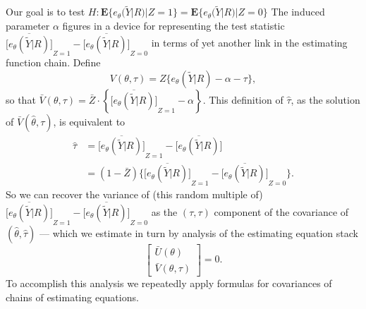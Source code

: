 \documentclass[12pt]{article}
\newcommand{\EE}{\mathbf{E}}
\begin{document}
Our goal is to test $H: \EE \{ e_{\theta} (\tilde{Y} | R) | Z=1 \} =
\EE \{ e_{\theta} (\tilde{Y} | R) | Z=0 \} $ The induced parameter $\alpha$ figures in a device for
representing the test statistic $\overline{\big[ e_{\theta}(\tilde{Y} | R)]}_{Z=1} - \overline{\big[
  e_{\theta}(\tilde{Y} | R )]}_{Z=0}$ in terms of yet another link in the estimating
function chain.  Define  
\begin{equation*} 
    V(\theta, \tau) = Z \{e_{\theta}(\tilde{Y} | R) - \alpha -
    \tau\}, 
\end{equation*}
so that $\bar{V}(\theta, \tau) = \bar{Z} \cdot \left\{
  \overline{\big[e_{\theta}(\tilde{Y} | R) \big]}_{Z=1} - \alpha
\right\}$. This definition of $\hat\tau$, as the solution of
$\bar{V}(\hat\theta, \tau)$, is equivalent to 
\begin{align*}
\hat\tau &=
\overline{\big[e_{\theta}(\tilde{Y} | R) \big]}_{Z=1} -
            \overline{\big[e_{\theta}(\tilde{Y} | R) \big]}  \\
&= (1-\bar{Z})  \big\{ \overline{\big[ e_{\theta}(\tilde{Y} | R)]}_{Z=1} - \overline{\big[
  e_{\theta}(\tilde{Y} | R )]}_{Z=0}  \big\}.
\end{align*}
So we can recover the variance of (this random multiple of) $\overline{\big[ e_{\theta}(\tilde{Y} | R)]}_{Z=1} - \overline{\big[
  e_{\theta}(\tilde{Y} | R )]}_{Z=0}$ as the $(\tau, \tau)$ 
component of the covariance of  $(\hat\theta, \hat\tau)$ --- which we
estimate in turn by analysis of the estimating equation stack 
\begin{equation*}
  \left[
    \begin{array}{c}
      \bar{U}(\theta) \\
      \bar{V}(\theta, \tau)
    \end{array}
\right] = 0 . 
\end{equation*}
To accomplish this analysis we repeatedly apply formulas for
covariances of chains of estimating equations.  
\end{document}
